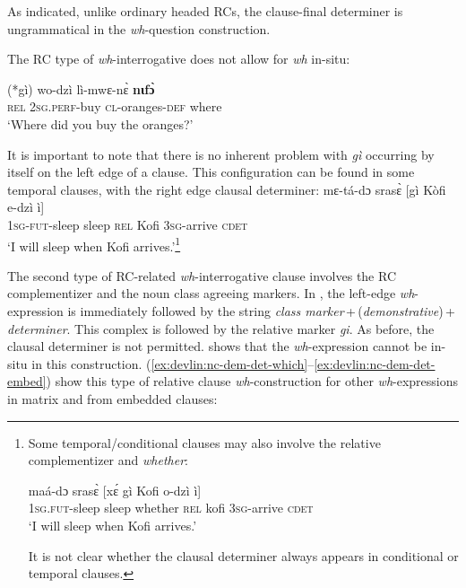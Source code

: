 \documentclass[output=paper]{langscibook}
\begin{document}

\noindent As indicated, unlike ordinary headed RCs, the clause-final determiner is ungrammatical in the \textit{wh}-question construction. 

The RC type of \textit{wh}-interrogative does not allow for \textit{wh} in-situ:


\ea
\gll (*g\`{i}) wo-dz\`{i} l\`{i}-mwɛ-n\`{ɛ} \textbf{nɩf\`{ɔ}}\\
 \textsc{rel} \textsc{2sg.perf}-buy \textsc{cl}-oranges-\textsc{def} where\\
\glt `Where did you buy the oranges?’
\z


It is important to note that there is no inherent problem with \textit{g\`{i}} occurring by itself on the left edge of a clause.  This configuration can be found in some temporal clauses, with the right edge clausal determiner:
\ea 
\gll mɛ-t\'{a}-dɔ sras\`{ɛ} [g\`{i} K\`{o}fi e-dz\`{i} \`{i}] \\
\textsc{1sg}-\textsc{fut}-sleep sleep \textsc{rel} Kofi \textsc{3sg}-arrive \textsc{cdet}\\
\glt `I will sleep when Kofi arrives.’\footnote{Some temporal/conditional clauses may also involve the relative complementizer and \textit{whether}: 
\begin{exe}
\sn
\gll ma\'{a}-dɔ sras\`{ɛ} [x\'{ɛ} g\`{i} Kofi o-dz\`{i} \`{i}]  \\
\textsc{1sg.fut}-sleep sleep whether \textsc{rel} kofi \textsc{3sg}-arrive \textsc{cdet}\\
\glt `I will sleep when Kofi arrives.’
\end{exe}
\noindent It is not clear whether the clausal determiner always appears in conditional or temporal clauses.
}
\z


The second type of RC-related \textit{wh}-interrogative clause involves the RC complementizer and the noun class agreeing markers. In , the left-edge \textit{wh}-expression is immediately followed by the string \textit{class marker}\,+\,(\textit{demonstrative})\,+ \textit{determiner}.  This complex is followed by the relative marker \textit{gi}. As before, the clausal determiner is not permitted.   shows that the \textit{wh}-expression cannot be in-situ in this construction. (\ref{ex:devlin:nc-dem-det-which}--\ref{ex:devlin:nc-dem-det-embed}) show this type of relative clause \textit{wh}-construction for other \textit{wh}-expressions in matrix and from embedded clauses:
\end{document}
